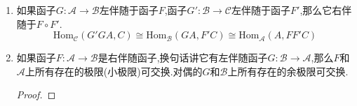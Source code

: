 \begin{enumerate}
\begin{proof}
    	现在证明条件2中的等式,以第二个等式为例,按照$\beta$的定义有$F\beta_{GB}\circ\alpha_{FGB}=1_{FGB}$.这里$\alpha(FGB)=FG\alpha_B$,于是就有$\beta_{GB}\circ G\alpha_B=1_{GB}$.此即第二个等式.
    	
    	\qquad
    	
    	2推3.给定态射$a:GB\to A$,定义$\theta(B,A)(a)$为复合态射$Fa\circ\alpha_B$:
    	$$\xymatrix{B\ar[rr]^{\alpha_B}&&FGB\ar[rr]^{Fa}&&FA}$$
    	
    	反过来给定态射$b:B\to FA$,定义$\tau(B,A)(b)$为复合态射$\beta_A\circ Gb$:
    	$$\xymatrix{GB\ar[rr]^{Gb}&&GFA\ar[rr]^{\beta_A}&&A}$$
    	
    	直接验证这两个映射互逆,比如如下交换图表说明$\tau\circ\theta(a)=a$:
    	$$\xymatrix{&&&&GB\ar[drr]^a&&\\GB\ar@{=}@/^1pc/[urrrr]\ar[rr]^{G\alpha_B}&&GFGB\ar[rr]^{GFa}\ar[urr]^{\beta_{GB}}&&GFA\ar[rr]^{\beta_A}&&A}$$
    	
    	验证自然性也是直接的,比如验证位置$A$的自然性,任取态射$f:A\to A'$,任取态射$a:GB\to A$,按照$F(f\circ a)=Ff\circ Fa$就得到如下交换图表:
    	$$\xymatrix{\mathrm{Hom}_{\mathscr{A}}(GB,A)\ar[rr]^{\theta(B,A)}\ar[d]&&\mathrm{Hom}_{\mathscr{B}}(B,FA)\ar[d]\\\mathrm{Hom}_{\mathscr{A}}(GB,A')\ar[rr]&&\mathrm{Hom}_{\mathscr{B}}(B,FA')}$$
    	
    	3推1.任取$\mathscr{B}$的对象$B$,我们断言$(GB,\theta(GB,B)(1_{GB}))$是$B$到$F$的泛态射.任取$\mathscr{A}$的对象$A$和态射$b:B\to FA$.那么存在唯一的态射$a:GB\to A$满足$b=\theta(a)$.按照$\theta$是自然同构,有$(Fa\circ\theta(GB,B)(1_{GB}))=\theta(A,B)(a)=b$.另外如果还有态射$a':GB\to A$满足$Fa'\circ\theta(GB,B)(1_{GB})=b$,也即$\theta(A,B)(a)=\theta(A,B)(a')$.按照$\theta$是自然同构就得到$a=a'$.
    	
    	4等价于3.我们已经证明了1等价于3,取对偶范畴,左伴随就变成了右伴随,自然同构仍然是自然同构,这说明3还等价于1的对偶命题,也即4.
    \end{proof}
    \item 如果函子$G:\mathscr{A}\to\mathscr{B}$左伴随于函子$F$,函子$G':\mathscr{B}\to\mathscr{C}$左伴随于函子$F'$,那么它右伴随于$F\circ F'$.
    $$\mathrm{Hom}_{\mathscr{C}}(G'GA,C)\cong\mathrm{Hom}_{\mathscr{B}}(GA,F'C)\cong\mathrm{Hom}_{\mathscr{A}}(A,FF'C)$$
    \item 如果函子$F:\mathscr{A}\to\mathscr{B}$是右伴随函子,换句话讲它有左伴随函子$G:\mathscr{B}\to\mathscr{A}$,那么$F$和$\mathscr{A}$上所有存在的极限(小极限)可交换.对偶的$G$和$\mathscr{B}$上所有存在的余极限可交换.
    \begin{proof}
    	

\end{proof}
\end{enumerate}
